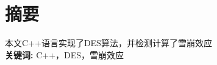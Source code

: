 \section*{ \centering 摘\quad 要}

\vskip0.5cm
本文C++语言实现了DES算法，并检测计算了雪崩效应\\


\textbf{关键词:}  C++，DES，雪崩效应

\clearpage





